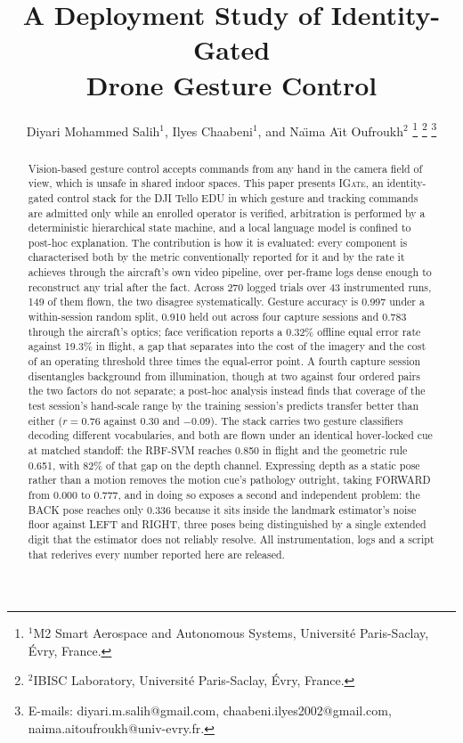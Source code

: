 \documentclass[conference]{IEEEtran}
\newcommand{\method}[1]{\textsc{#1}}
\begin{document}
\title{A Deployment Study of Identity-Gated\\Drone Gesture Control}

\author{Diyari Mohammed Salih$^{1}$,
        Ilyes Chaabeni$^{1}$,
        and Na\"{\i}ma A\"{\i}t Oufroukh$^{2}$%
\thanks{$^{1}$M2 Smart Aerospace and Autonomous Systems,
Universit\'e Paris-Saclay, \'Evry, France.}%
\thanks{$^{2}$IBISC Laboratory, Universit\'e Paris-Saclay, \'Evry, France.}%
\thanks{E-mails: diyari.m.salih@gmail.com,
chaabeni.ilyes2002@gmail.com,
naima.aitoufroukh@univ-evry.fr.}%
}

\maketitle

\begin{abstract}
Vision-based gesture control accepts commands from any hand in the camera field
of view, which is unsafe in shared indoor spaces. This paper presents
\method{IGate}, an identity-gated control stack for the DJI Tello EDU in which
gesture and tracking commands are admitted only while an enrolled operator is
verified, arbitration is performed by a deterministic hierarchical state machine,
and a local language model is confined to post-hoc explanation. The contribution
is how it is evaluated: every component is characterised both by the metric
conventionally reported for it and by the rate it achieves through the aircraft's
own video pipeline, over per-frame logs dense enough to reconstruct any trial
after the fact. Across 270 logged trials over 43 instrumented runs, 149 of them
flown, the two disagree systematically. Gesture accuracy is 0.997 under a
within-session random split, 0.910 held out across four capture sessions and
0.783 through the aircraft's optics; face verification reports a 0.32\% offline
equal error rate against 19.3\% in flight, a gap that separates into the cost of
the imagery and the cost of an operating threshold three times the equal-error
point. A fourth capture session disentangles background from illumination, though at
two against four ordered pairs the two factors do not separate; a post-hoc
analysis instead finds that coverage of the test session's hand-scale range by
the training session's predicts transfer better than either ($r=0.76$ against
0.30 and $-0.09$). The stack carries two gesture classifiers decoding different vocabularies, and
both are flown under an identical hover-locked cue at matched standoff: the
RBF-SVM reaches 0.850 in flight and the geometric rule 0.651, with 82\% of that
gap on the depth channel. Expressing depth as a static pose rather than a motion
removes the motion cue's pathology outright, taking FORWARD from 0.000 to 0.777,
and in doing so exposes a second and independent problem: the BACK pose reaches
only 0.336 because it sits inside the landmark estimator's noise floor against
LEFT and RIGHT, three poses being distinguished by a single extended digit that
the estimator does not reliably resolve. All instrumentation, logs
and a script that rederives every number reported here are released.
\end{abstract}
\end{document}
